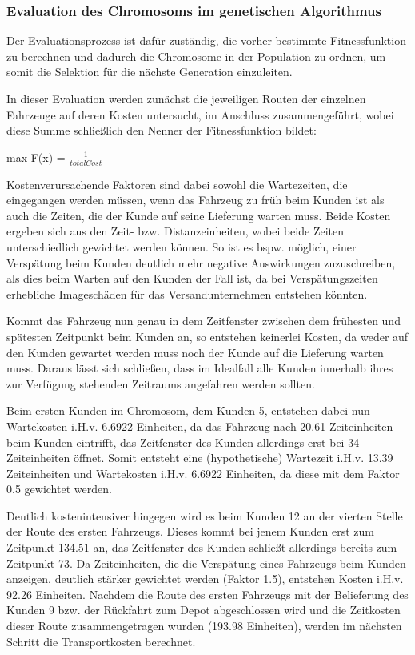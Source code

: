 \documentclass[a4paper,12pt,parskip,bibtotoc,liststotoc]{article}
\begin{document}
\subsubsection{Evaluation des Chromosoms im genetischen Algorithmus}

Der Evaluationsprozess ist dafür zuständig, die vorher bestimmte Fitnessfunktion zu berechnen und dadurch die Chromosome in der Population zu ordnen, um somit die Selektion für die nächste Generation einzuleiten.

In dieser Evaluation werden zunächst die jeweiligen Routen der einzelnen Fahrzeuge auf deren Kosten untersucht, im Anschluss zusammengeführt, wobei diese Summe schließlich den Nenner der Fitnessfunktion bildet:

\begin{center}
max F(x) = $\frac{1}{totalCost}$
\end{center}

Kostenverursachende Faktoren sind dabei sowohl die Wartezeiten, die eingegangen werden müssen, wenn das Fahrzeug zu früh beim Kunden ist als auch die Zeiten, die der Kunde auf seine Lieferung warten muss. 
Beide Kosten ergeben sich aus den Zeit- bzw. Distanzeinheiten, wobei beide Zeiten unterschiedlich gewichtet werden können. 
So ist es bspw. möglich, einer Verspätung beim Kunden deutlich mehr negative Auswirkungen zuzuschreiben, als dies beim Warten auf den Kunden der Fall ist, da bei Verspätungszeiten erhebliche Imageschäden für das Versandunternehmen entstehen könnten.

Kommt das Fahrzeug nun genau in dem Zeitfenster zwischen dem frühesten und spätesten Zeitpunkt beim Kunden an, so entstehen keinerlei Kosten, da weder auf den Kunden gewartet werden muss noch der Kunde auf die Lieferung warten muss.
Daraus lässt sich schließen, dass im Idealfall alle Kunden innerhalb ihres zur Verfügung stehenden Zeitraums angefahren werden sollten.

Beim ersten Kunden im Chromosom, dem Kunden 5, entstehen dabei nun Wartekosten i.H.v. 6.6922 Einheiten, da das Fahrzeug nach 20.61 Zeiteinheiten beim Kunden eintrifft, das Zeitfenster des Kunden allerdings erst bei 34 Zeiteinheiten öffnet.
Somit entsteht eine (hypothetische) Wartezeit i.H.v. 13.39 Zeiteinheiten und Wartekosten i.H.v. 6.6922 Einheiten, da diese mit dem Faktor 0.5 gewichtet werden. 

Deutlich kostenintensiver hingegen wird es beim Kunden 12 an der vierten Stelle der Route des ersten Fahrzeugs. 
Dieses kommt bei jenem Kunden erst zum Zeitpunkt 134.51 an, das Zeitfenster des Kunden schließt allerdings bereits zum Zeitpunkt 73.
Da Zeiteinheiten, die die Verspätung eines Fahrzeugs beim Kunden anzeigen, deutlich stärker gewichtet werden (Faktor 1.5), entstehen Kosten i.H.v. 92.26 Einheiten.
Nachdem die Route des ersten Fahrzeugs mit der Belieferung des Kunden 9 bzw. der Rückfahrt zum Depot abgeschlossen wird und die Zeitkosten dieser Route zusammengetragen wurden (193.98 Einheiten), werden im nächsten Schritt die Transportkosten berechnet.\\
\end{document}
